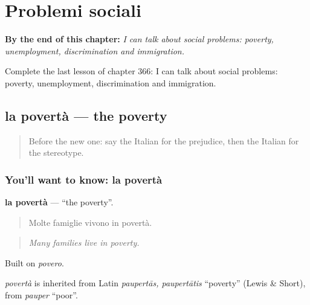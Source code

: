 
\chapter{Problemi sociali}
\label{ch:it-problemi-sociali}

\begin{chapteropening}
\textbf{By the end of this chapter:} \emph{I can talk about social problems: poverty, unemployment, discrimination and immigration.}

Complete the last lesson of chapter 366: I can talk about social problems: poverty, unemployment, discrimination and immigration.
\end{chapteropening}

\section[la povertà]{la povertà — the poverty}

\label{lesson:IT-C366-poverta}



\begin{quote}
Before the new one: say the Italian for the prejudice, then the Italian for the stereotype.
\end{quote}

\subsection*{You'll want to know: la povertà}
\textbf{la povertà} — \textquotedblleft{}the poverty\textquotedblright{}.

\begin{quote}
Molte famiglie vivono in povertà.
\end{quote}

\begin{quote}
\emph{Many families live in poverty.}
\end{quote}

Built on \emph{povero}.

\begin{cousinweb}
\emph{povertà} is inherited from Latin \emph{paupertās, paupertātis} \textquotedblleft{}poverty\textquotedblright{} (Lewis \& Short), from \emph{pauper} \textquotedblleft{}poor\textquotedblright{}.
\end{cousinweb}


